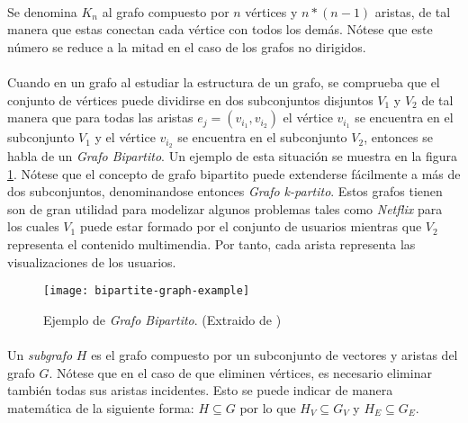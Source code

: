 \documentclass{subfiles}
\begin{document}
      \paragraph{}
      Se denomina $K_n$ al grafo compuesto por $n$ vértices y $n*(n-1)$ aristas, de tal manera que estas conectan cada vértice con todos los demás. Nótese que este número se reduce a la mitad en el caso de los grafos no dirigidos.

      \paragraph{}
      Cuando en un grafo al estudiar la estructura de un grafo, se comprueba que el conjunto de vértices puede dividirse en dos subconjuntos disjuntos $V_1$ y $V_2$ de tal manera que para todas las aristas $e_j = (v_{i_1}, v_{i_2})$ el vértice $v_{i_1}$ se encuentra en el subconjunto $V_1$ y el vértice $v_{i_2}$ se encuentra en el subconjunto $V_2$, entonces se habla de un \emph{Grafo Bipartito}. Un ejemplo de esta situación se muestra en la figura \ref{img:bipartite_graph_example}. Nótese que el concepto de grafo bipartito puede extenderse fácilmente a más de dos subconjuntos, denominandose entonces \emph{Grafo k-partito}. Estos grafos tienen son de gran utilidad para modelizar algunos problemas tales como \emph{Netflix} para los cuales $V_1$ puede estar formado por el conjunto de usuarios mientras que $V_2$ representa el contenido multimendia. Por tanto, cada arista representa las visualizaciones de los usuarios.

      \begin{figure}
        \centering
        \texttt{[image: bipartite-graph-example]}
        \caption{Ejemplo de \emph{Grafo Bipartito}. (Extraido de \cite{wiki:Graph_(discrete_mathematics)})}
        \label{img:bipartite_graph_example}
      \end{figure}

      \paragraph{}
      Un \emph{subgrafo} $H$ es el grafo compuesto por un subconjunto de vectores y aristas del grafo $G$. Nótese que en el caso de que eliminen vértices, es necesario eliminar también todas sus aristas incidentes. Esto se puede indicar de manera matemática de la siguiente forma: $H \subseteq G$ por lo que $H_V \subseteq G_V$ y $H_E \subseteq G_E$.
\end{document}

